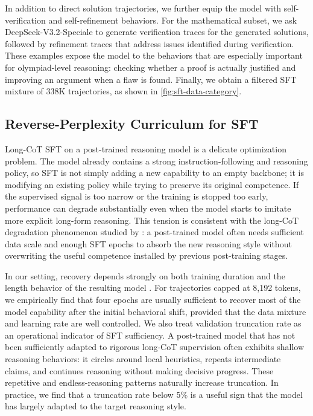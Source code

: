 \documentclass{llmxive}
\begin{document}
In addition to direct solution trajectories, we further equip the model with
self-verification and self-refinement behaviors. 
For the mathematical subset, we ask DeepSeek-V3.2-Speciale to generate verification traces for the generated solutions, followed by refinement traces that address issues identified during verification. 
These examples expose the model to the behaviors that are
especially important for olympiad-level reasoning: checking whether a proof is
actually justified and improving an argument when a flaw is found. Finally, we
obtain a filtered SFT mixture of 338K trajectories, as shown in
\cref{fig:sft-data-category}.

\subsection{Reverse-Perplexity Curriculum for SFT}
\label{sec:reverse-ppl-curriculum}

Long-CoT SFT on a post-trained reasoning model is a delicate optimization
problem. The model already contains a strong instruction-following and
reasoning policy, so SFT is not simply adding a new capability to an empty
backbone; it is modifying an existing policy while trying to preserve its
original competence. 
If the supervised signal is too narrow or the training is
stopped too early, performance can degrade substantially even when the model
starts to imitate more explicit long-form reasoning. This tension is consistent
with the long-CoT degradation phenomenon studied by \citet{luo2025through}: a
post-trained model often needs sufficient data scale and enough SFT epochs to
absorb the new reasoning style without overwriting the useful competence
installed by previous post-training stages.

In our setting, recovery depends strongly on both training duration and the
length behavior of the resulting model \citep{ren2026rethinking}. For trajectories capped at 8,192 tokens,
we empirically find that four epochs are usually sufficient to recover most of
the model capability after the initial behavioral shift, provided that the data
mixture and learning rate are well controlled. 
We also treat validation truncation rate as an operational indicator
of SFT sufficiency. A post-trained model that has
not been sufficiently adapted to rigorous long-CoT supervision often exhibits
shallow reasoning behaviors: it circles around local heuristics, repeats
intermediate claims, and continues reasoning without making decisive progress.
These repetitive and endless-reasoning patterns naturally increase truncation.
In practice, we find that a truncation rate below 5\% is a useful sign that the model has
largely adapted to the target reasoning style.
\end{document}
